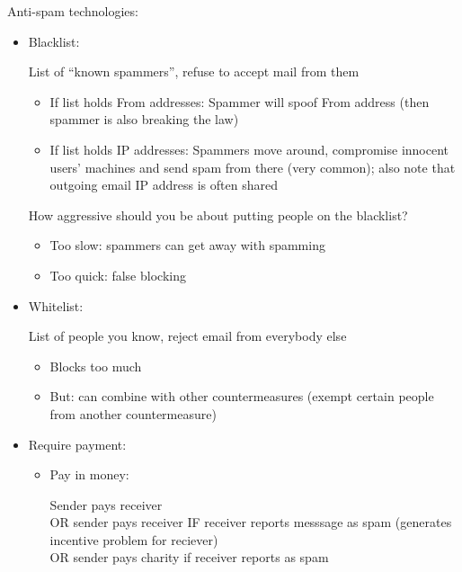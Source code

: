 Anti-spam technologies:
\begin{itemize}
    \item Blacklist:

        List of ``known spammers'', refuse to accept mail from them
        \begin{itemize}
            \item If list holds From addresses: Spammer will spoof From address
                (then spammer is also breaking the law)
            \item If list holds IP addresses: Spammers move around, compromise
                innocent users' machines and send spam from there (very common);
                also note that outgoing email IP address is often shared
        \end{itemize}
        How aggressive should you be about putting people on the blacklist?
        \begin{itemize}
            \item Too slow: spammers can get away with spamming
            \item Too quick: false blocking
        \end{itemize}
    \item Whitelist:

        List of people you know, reject email from everybody else
        \begin{itemize}
            \item Blocks too much
            \item But: can combine with other countermeasures (exempt certain
                    people from another countermeasure)
        \end{itemize}
    \item Require payment:
        \begin{itemize}
            \item Pay in money:

                Sender pays receiver\\
                OR sender pays receiver IF receiver reports messsage as spam
                (generates incentive problem for reciever)\\
                OR sender pays charity if receiver reports as spam


\end{itemize}
\end{itemize}
